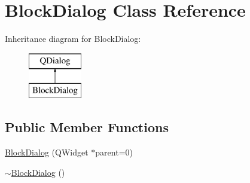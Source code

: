 \hypertarget{classBlockDialog}{}\section{Block\+Dialog Class Reference}
\label{classBlockDialog}
Inheritance diagram for Block\+Dialog\+:\begin{figure}[H]
\begin{center}
\leavevmode
\includegraphics[height=2.000000cm]{classBlockDialog}
\end{center}
\end{figure}
\subsection*{Public Member Functions}
\begin{DoxyCompactItemize}
\item 
\hyperlink{classBlockDialog_ab73c3fae34eb587bee67c0b67974c97e}{Block\+Dialog} (Q\+Widget $\ast$parent=0)
\item 
\hyperlink{classBlockDialog_a7a524e7d75f6b0c0addb855de52d713f}{$\sim$\+Block\+Dialog} ()
\end{DoxyCompactItemize}
